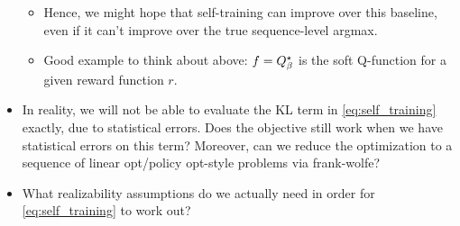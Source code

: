 \documentclass{article}
\begin{document}
\begin{itemize}
  \begin{itemize}
  \item Hence, we might hope that self-training can improve over this
    baseline, even if it can't improve over the true sequence-level
    argmax.
  \item Good example to think about above: $f=Q^{\star}_{\beta}$ is the soft
    Q-function for a given reward function $r$.
  \end{itemize}
\item In reality, we will not be able to evaluate the KL term in
  \cref{eq:self_training} exactly, due to statistical errors. Does the
  objective still work when we have statistical errors on this term?
  Moreover, can we reduce the optimization to a sequence of linear
  opt/policy opt-style problems via frank-wolfe?
\item What realizability assumptions do we actually need in order for
  \cref{eq:self_training} to work out?
\end{itemize}
\end{document}

